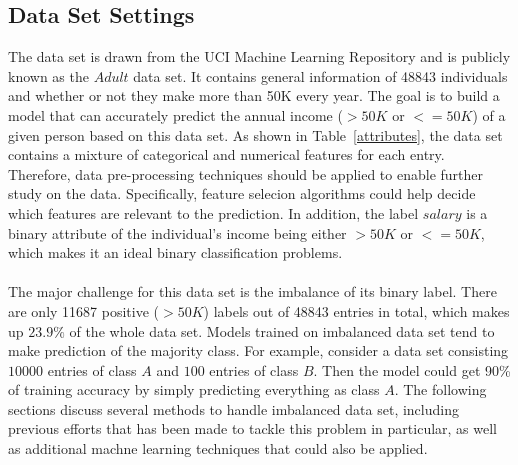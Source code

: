 \documentclass{article}
\begin{document}
\subsection{Data Set Settings}
The data set is drawn from the UCI Machine Learning Repository and is publicly known as the $Adult$ data set. It contains general information of 48843 individuals and whether or not they make more than 50K every year. The goal is to build a model that can accurately predict the annual income ($>50K$ or $<=50K$) of a given person based on this data set. As shown in Table~\ref{attributes}, the data set contains a mixture of categorical and numerical features for each entry. Therefore, data pre-processing techniques should be applied to enable further study on the data. Specifically, feature selecion algorithms could help decide which features are relevant to the prediction. In addition, the label $salary$ is a binary attribute of the individual's income being either $>50K$ or $<=50K$, which makes it an ideal binary classification problems.\\\\
The major challenge for this data set is the imbalance of its binary label. There are only 11687 positive ($>50K$) labels out of 48843 entries in total, which makes up $23.9\%$ of the whole data set. Models trained on imbalanced data set tend to make prediction of the majority class. For example, consider a data set consisting $10000$ entries of class $A$ and $100$ entries of class $B$. Then the model could get 90\% of training accuracy by simply predicting everything as class $A$. The following sections discuss several methods to handle imbalanced data set, including previous efforts that has been made to tackle this problem in particular, as well as additional machne learning techniques that could also be applied.
\end{document}
